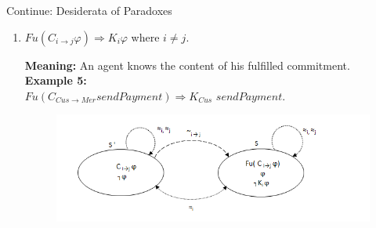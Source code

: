 \documentclass{beamer}
\begin{document}
\begin{frame}{Continue: Desiderata of Paradoxes}
\begin{enumerate}
\vspace{0.2cm} \item [P5.][\textbf{Knowing the content of his own
fulfilled commitment}]

$Fu (C _{i\rightarrow j} \varphi) \Rightarrow K _i \varphi$ where
$i \neq j$.

\textbf{Meaning:} An agent knows the content of his fulfilled
commitment.\\
\textbf{Example 5:}\\
$Fu (C _{Cus\rightarrow Mer} sendPayment) \Rightarrow K_{Cus}$ $sendPayment$.
\begin{figure}[htbp]
    \begin{center}
    \includegraphics[width=.75 \columnwidth]{figures/figure3.png}
    \end{center}
    \end{figure}

\end{enumerate}     	
\end{frame}
\end{document}
